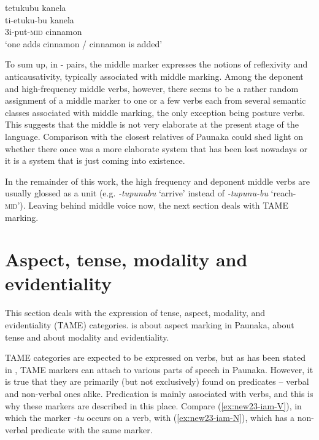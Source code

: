 \ea\label{ex:mid-impers}
\begingl 
\glpreamble tetukubu kanela\\
\gla ti-etuku-bu kanela\\ 
\glb 3i-put-\textsc{mid} cinnamon\\ 
\glft ‘one adds cinnamon / cinnamon is added’
 \trailingcitation{[jxx-e110923l-2.121]}
\xe

To sum up, in - pairs, the middle marker expresses the notions of reflexivity and anticausativity, typically associated with middle marking. Among the deponent and high-frequency middle verbs, however, there seems to be a rather random assignment of a middle marker to one or a few verbs each from several semantic classes associated with middle marking, the only exception being posture verbs. This suggests that the middle is not very elaborate at the present stage of the language. Comparison with the closest relatives of Paunaka could shed light on whether there once was a more elaborate system that has been lost nowadays or it is a system that is just coming into existence.

In the remainder of this work, the high frequency and deponent middle verbs are usually glossed as a unit (e.g. \textit{-tupunubu} ‘arrive’ instead of \textit{-tupunu-bu} ‘reach-\textsc{mid}’). Leaving behind middle voice now, the next section deals with TAME marking.%
\section{Aspect, tense, modality and evidentiality}\label{sec:OperationsPredicates}

This section deals with the expression of tense,  aspect, modality, and evidentiality (TAME) categories.  is about aspect marking in Paunaka,  about tense and  about modality and evidentiality. 

TAME categories are expected to be expressed on verbs, but as has been stated in , TAME markers can attach to various parts of speech in Paunaka. However, it is true that they are primarily (but not exclusively) found on predicates -- verbal and non-verbal ones alike. Predication is mainly associated with verbs, and this is why these markers are described in this place. Compare (\ref{ex:new23-iam-V}), in which the  marker \textit{-tu} occurs on a verb, with (\ref{ex:new23-iam-N}), which has a non-verbal predicate with the same  marker.

